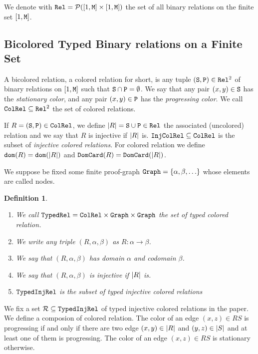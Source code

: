 \documentclass{lmcs}
\newtheorem{definition}[theorem]{Definition}
\begin{document}

We denote with ${\tt Rel} = {\mathcal P}([1,{\tt M}] \times [1,{\tt M}])$ 
the set of all binary relations on the finite set $[1,{\tt M}]$.


\subsection{Bicolored Typed Binary relations on a Finite Set}
A bicolored relation, a colored relation for short, 
is any tuple $({\tt S},{\tt P}) \in {\tt Rel}^2$ of binary relations on
$[1,{\tt M}]$ such that ${\tt S} \cap {\tt P} = \emptyset$. We say that any pair $(x,y) \in {\tt S}$
has the \emph{stationary color}, and any pair $(x,y) \in {\tt P}$ has the 
\emph{progressing color}. We call ${\tt ColRel} \subseteq {\tt Rel}^2$ the set of colored relations. 

If $R= ({\tt S},{\tt P}) \in {\tt ColRel}$, we define ${| R |} = {\tt S} \cup {\tt P} \in {\tt Rel}$ 
the associated (uncolored) relation and we say that $R$ is injective if ${| R |}$ is. 
${\tt InjColRel} \subseteq {\tt ColRel}$ is the subset of \emph{injective colored relations}.
For colored relation we define ${\tt dom}(R) = {\tt dom}({| R |})$ and 
${\tt DomCard}(R) = {\tt DomCard}({| R |})$. 

We suppose be fixed some finite proof-graph 
${\tt Graph} = \{\alpha, \beta, \ldots\}$ whose elements are called nodes. 

\begin{definition}
\label{definition-typed-injective-colored-rel}
\begin{enumerate}
\item
We call ${\tt TypedRel} = {\tt ColRel} \times {\tt Graph} \times {\tt Graph}$ the set of typed colored relation.
\item
We write any triple $(R,\alpha,\beta)$ as $R: \alpha \rightarrow \beta$. 
\item
We say that $(R,\alpha,\beta)$ has domain $\alpha$ and codomain $\beta$.
\item
We say that $(R,\alpha,\beta)$ is injective if ${| R |}$ is.
\item
${\tt TypedInjRel}$ is the subset of
typed injective colored relations
\end{enumerate}
\end{definition}

We fix a set ${\mathcal R} \subseteq {\tt TypedInjRel}$ of typed injective colored relations in the paper. 
We define a composion of colored relation. The color of an edge $(x,z) \in RS$ is progressing 
if and only if there are two edge $(x,y) \in {| R |}$ and $(y,z) \in {| S |}$ 
and at least one of them is progressing. 
The color of an edge $(x,z) \in RS$ is stationary otherwise.
\end{document}
